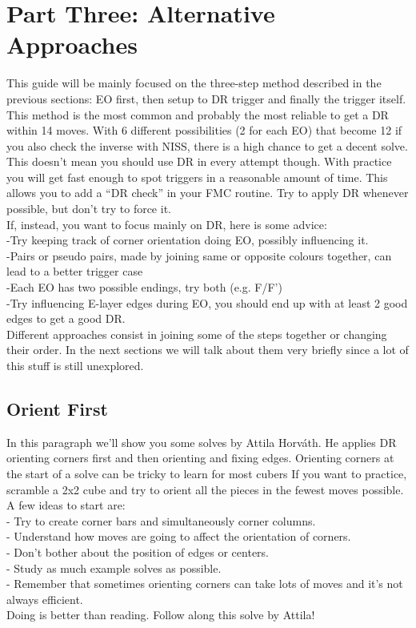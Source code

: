 \documentclass[11pt,a4paper]{book}
\begin{document}
\chapter{Part Three: Alternative Approaches}

This guide will be mainly focused on the three-step method described in the previous sections: EO first, then setup to DR trigger and finally the trigger itself. This method is the most common and probably the most reliable to get a DR within 14 moves. With 6 different possibilities (2 for each EO) that become 12 if you also check the inverse with NISS, there is a high chance to get a decent solve. This doesn’t mean you should use DR in every attempt though. With practice you will get fast enough to spot triggers in a reasonable amount of time. This allows you to add a “DR check” in your FMC routine. Try to apply DR whenever possible, but don’t try to force it.\\
\newline
If, instead, you want to focus mainly on DR, here is some advice:\\
\newline
-Try keeping track of corner orientation doing EO, possibly influencing it.\\
-Pairs or pseudo pairs, made by joining same or opposite colours together, can lead to a better trigger case \\
-Each EO has two possible endings, try both (e.g. F/F’)\\
-Try influencing E-layer edges during EO, you should end up with at least 2 good edges to get a good DR.\\
\newline
Different approaches consist in joining some of the steps together or changing their order. In the next sections we will talk about them very briefly since a lot of this stuff is still unexplored.


\section{Orient First}

In this paragraph we’ll show you some solves by Attila Horváth. He applies DR orienting corners first and then orienting and fixing edges. 
Orienting corners at the start of a solve can be tricky to learn for most cubers If you want to practice, scramble a 2x2 cube and try to orient all the pieces in the fewest moves possible. A few ideas to start are:\\
\newline
- Try to create corner bars and simultaneously corner columns.\\
- Understand how moves are going to affect the orientation of corners.\\
- Don’t bother about the position of edges or centers.\\
- Study as much example solves as possible.\\
- Remember that sometimes orienting corners can take lots of moves and it’s not always efficient.\\
\newline
Doing is better than reading. Follow along this solve by Attila!
\end{document}

